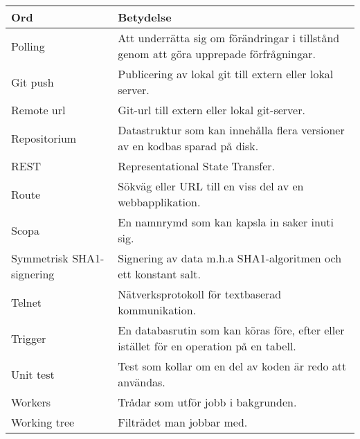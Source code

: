 \begin{tabular} { | l | p{10cm} | }
\hline
\bf{Ord} & \bf{Betydelse} \\
\hline
Polling & Att underrätta sig om förändringar i tillstånd genom att göra upprepade förfrågningar. \\
\hline
Git push & Publicering av lokal git till extern eller lokal server. \\
\hline
Remote url & Git-url till extern eller lokal git-server. \\
\hline
Repositorium & Datastruktur som kan innehålla flera versioner av en kodbas sparad på disk. \\
\hline
REST & Representational State Transfer. \\
\hline
Route & Sökväg eller URL till en viss del av en webbapplikation. \\
\hline
Scopa & En namnrymd som kan kapsla in saker inuti sig. \\
\hline
Symmetrisk SHA1-signering & Signering av data m.h.a SHA1-algoritmen och ett konstant salt. \\
\hline
Telnet & Nätverksprotokoll för textbaserad kommunikation. \\
\hline
Trigger & En databasrutin som kan köras före, efter eller istället för en operation på en tabell. \\
\hline
Unit test & Test som kollar om en del av koden är redo att användas. \\
\hline
Workers & Trådar som utför jobb i bakgrunden. \\
\hline
Working tree & Filträdet man jobbar med. \\
\hline
\end{tabular}
\normalsize

